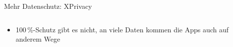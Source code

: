 \documentclass{beamer}
\begin{document}
\begin{frame}{Mehr Datenschutz: XPrivacy}
        \pause

\begin{columns}[c]
  \begin{column}[T]{.7\textwidth}
    \vspace{-1cm}
      \begin{itemize}
        \item 100\,\%-Schutz gibt es nicht, an viele Daten kommen die Apps auch auf anderem Wege
      \end{itemize}
   \end{column}
  \begin{column}[T]{.3\textwidth}
   \end{column}
\end{columns}

\end{frame}
\end{document}
